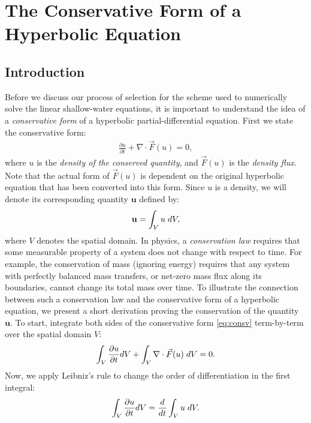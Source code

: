 \documentclass[12pt,a4]{article}
\begin{document}
\section{The Conservative Form of a Hyperbolic Equation}
\subsection{Introduction}
Before we discuss our process of selection for the scheme used to numerically solve the linear shallow-water equations, it is important to understand the idea of a \textit{conservative form} of a hyperbolic partial-differential equation. First we state the conservative form:
\begin{gather}\label{eq:consv}
	\frac{\partial u}{\partial t} + \nabla \cdot \vec F(u) = 0,
\end{gather}
where $u$ is the \textit{density of the conserved quantity}, and $\vec F (u)$ is the \textit{density flux}. Note that the actual form of $\vec F(u)$ is dependent on the original hyperbolic equation that has been converted into this form. Since $u$ is a density, we will denote its corresponding quantity $\mathbf{u}$ defined by:
\begin{gather}\label{eq:dens}
	\mathbf{u} = \int_V u\hspace*{0.10 cm} dV,
\end{gather}
where $V$ denotes the spatial domain. In physics, a \textit{conservation law} requires that some measurable property of a system does not change with respect to time. For example, the conservation of mass (ignoring energy) requires that any system with perfectly balanced mass transfers, or net-zero mass flux along its boundaries, cannot change its total mass over time. To illustrate the connection between such a conservation law and the conservative form of a hyperbolic equation, we present a short derivation proving the conservation of the quantity $\mathbf{u}$. To start, integrate both sides of the conservative form \ref{eq:consv} term-by-term over the spatial domain $V$:
\begin{gather}\label{eq:int}
	\int_V \frac{\partial u}{\partial t} dV + \int_V \nabla \cdot \vec F(u)\hspace*{0.10 cm} dV = 0.
\end{gather}
Now, we apply Leibniz's rule to change the order of differentiation in the first integral:
\begin{gather}\label{eq:s1}
	\int_V \frac{\partial u}{\partial t} dV = \frac{d}{dt} \int_V u\hspace*{0.10 cm} dV.
\end{gather}
\end{document}
